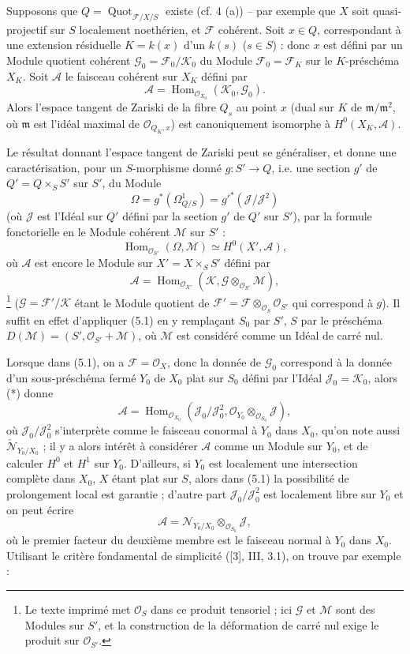  Supposons que
$Q=\operatorname{Quot}_{\mathcal F/X/S}$ existe (cf. 4 (a)) -- par exemple que
$X$ soit quasi-projectif sur $S$ localement noethérien, et $\mathcal F$
cohérent. Soit $x\in Q$, correspondant à une extension résiduelle $K=k(x)$
d'un $k(s)$ ($s\in S$) :
donc $x$ est défini par un Module quotient cohérent
$\mathcal G_0=\mathcal F_0/\mathcal K_0$ du Module
$\mathcal F_0=\mathcal F_K$ sur le $K$-préschéma $X_K$. Soit $\mathcal A$ le
faisceau cohérent sur $X_K$ défini par
\[
\mathcal A=\operatorname{Hom}_{\mathcal O_{X_0}}(\mathcal K_0,\mathcal G_0).
\]
Alors l'espace tangent de Zariski de la fibre $Q_s$ au point $x$ (dual sur $K$
de $\mathfrak m/\mathfrak m^2$, où $\mathfrak m$ est l'idéal maximal de
$\mathcal O_{Q_K,x}$) est canoniquement isomorphe à $H^0(X_K,\mathcal A)$.

Le résultat donnant l'espace tangent de Zariski peut se généraliser, et donne
une caractérisation, pour un $S$-morphisme donné $g:S'\longrightarrow Q$, i.e.
une section $g'$ de $Q'=Q\times_SS'$ sur $S'$, du Module
\[
\Omega=g^*(\Omega^1_{Q/S})=g'^*(\mathcal J/\mathcal J^2)
\]
(où $\mathcal J$ est l'Idéal sur $Q'$ défini par la section $g'$ de $Q'$ sur
$S'$), par la formule fonctorielle en le Module cohérent $\mathcal M$ sur $S'$ :
\[
\operatorname{Hom}_{\mathcal O_{S'}}(\Omega,\mathcal M)
\simeq H^0(X',\mathcal A),
\]
où $\mathcal A$ est encore le Module sur $X'=X\times_SS'$ défini par
\[
\mathcal A=\operatorname{Hom}_{\mathcal O_{X'}}
(\mathcal K,\mathcal G\otimes_{\mathcal O_{S'}}\mathcal M),
\]
\footnote{Le texte imprimé met $\mathcal O_S$ dans ce produit tensoriel ; ici
$\mathcal G$ et $\mathcal M$ sont des Modules sur $S'$, et la construction de
la déformation de carré nul exige le produit sur $\mathcal O_{S'}$.}
($\mathcal G=\mathcal F'/\mathcal K$ étant le Module quotient de
$\mathcal F'=\mathcal F\otimes_{\mathcal O_S}\mathcal O_{S'}$ qui correspond à
$g$). Il suffit en effet d'appliquer (5.1) en y remplaçant $S_0$ par $S'$, $S$
par le préschéma $D(\mathcal M)=(S',\mathcal O_{S'}+\mathcal M)$, où
$\mathcal M$ est considéré comme un Idéal de carré nul.

Lorsque dans (5.1), on a $\mathcal F=\mathcal O_X$, donc la donnée de
$\mathcal G_0$ correspond à la donnée d'un sous-préschéma fermé $Y_0$ de $X_0$
plat sur $S_0$ défini par l'Idéal $\mathcal J_0=\mathcal K_0$, alors (*) donne
\[
\mathcal A=\operatorname{Hom}_{\mathcal O_{X_0}}
(\mathcal J_0/\mathcal J_0^2,
\mathcal O_{Y_0}\otimes_{\mathcal O_{S_0}}\mathcal J),
\]
où $\mathcal J_0/\mathcal J_0^2$ s'interprète comme le faisceau conormal à $Y_0$
dans $X_0$, qu'on note aussi
$\check{\mathcal N}_{Y_0/X_0}$ ; il y a alors intérêt à considérer $\mathcal A$
comme un Module sur $Y_0$, et de calculer $H^0$ et $H^1$ sur $Y_0$. D'ailleurs,
si $Y_0$ est localement une intersection complète dans $X_0$, $X$ étant plat
sur $S$, alors dans (5.1) la possibilité de prolongement local est garantie ;
d'autre part $\mathcal J_0/\mathcal J_0^2$ est localement libre sur $Y_0$ et on peut
écrire
\[
\mathcal A=\mathcal N_{Y_0/X_0}\otimes_{\mathcal O_{S_0}}\mathcal J,
\]
où le premier facteur du deuxième membre est le faisceau normal à $Y_0$ dans
$X_0$. Utilisant le critère fondamental de simplicité ([3], III, 3.1), on
trouve par exemple :

